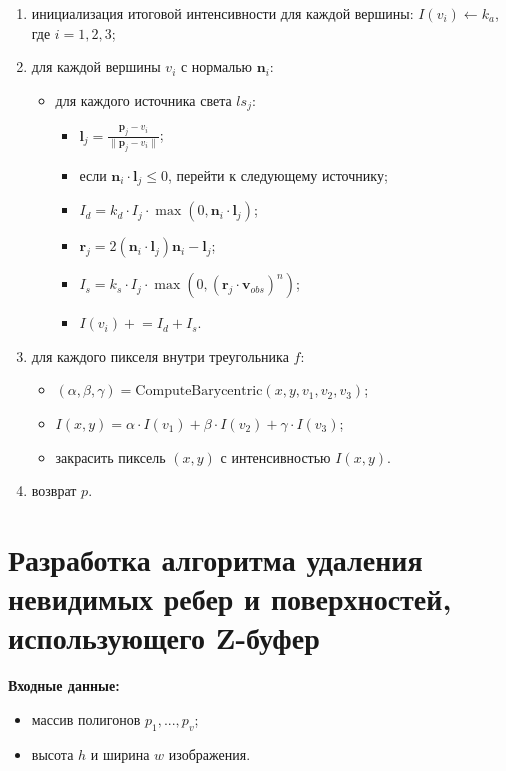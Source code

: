 \begin{enumerate}
    \item инициализация итоговой интенсивности для каждой вершины: $I(v_i) \gets k_a$, где $i = 1, 2, 3$;
    \item для каждой вершины $v_i$ с нормалью $\mathbf{n}_i$:
    \begin{itemize}
        \item для каждого источника света $ls_j$:
        \begin{itemize}
            \item $\mathbf{l}_j = \frac{\mathbf{p}_j - v_i}{\|\mathbf{p}_j - v_i\|}$;
            \item если $\mathbf{n}_i \cdot \mathbf{l}_j \leq 0$, перейти к следующему источнику;
            \item $I_d = k_d \cdot I_j \cdot \max(0, \mathbf{n}_i \cdot \mathbf{l}_j)$;
            \item $\mathbf{r}_j = 2(\mathbf{n}_i \cdot \mathbf{l}_j)\mathbf{n}_i - \mathbf{l}_j$;
            \item $I_s = k_s \cdot I_j \cdot \max(0, (\mathbf{r}_j \cdot \mathbf{v}_{obs})^n)$;
            \item $I(v_i) \mathrel{+}= I_d + I_s$.
        \end{itemize}
    \end{itemize}
    \item для каждого пикселя внутри треугольника $f$:
    \begin{itemize}
        \item $(\alpha, \beta, \gamma) = \text{ComputeBarycentric}(x, y, v_1, v_2, v_3)$;
        \item $I(x, y) = \alpha \cdot I(v_1) + \beta \cdot I(v_2) + \gamma \cdot I(v_3)$;
        \item закрасить пиксель $(x, y)$ с интенсивностью $I(x, y)$.
    \end{itemize}
    \item возврат $p$.
\end{enumerate}

\section{Разработка алгоритма удаления невидимых ребер и поверхностей, использующего Z-буфер}

\textbf{Входные данные:}
\begin{itemize}
    \item массив полигонов $p_1, ..., p_v$;
    \item высота $h$ и ширина $w$ изображения.
\end{itemize}

